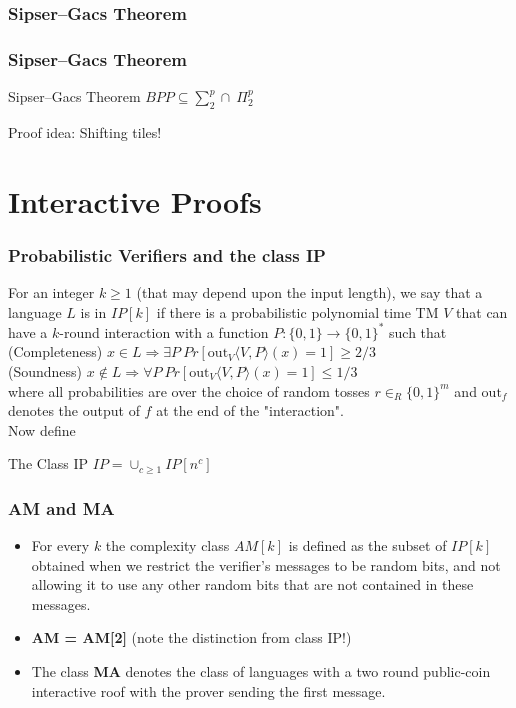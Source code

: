\documentclass{beamer}
\begin{document}
\subsubsection{Sipser--Gacs Theorem}

\begin{frame}
\frametitle{Sipser--Gacs Theorem}
\begin{block}{Sipser--Gacs Theorem}
$BPP \subseteq \sum_2^p \cap\ \Pi_2^p$
\end{block}

Proof idea: Shifting tiles!

\end{frame}

\section{Interactive Proofs}

\begin{frame}
\frametitle{Probabilistic Verifiers and the class IP}

For an integer $k \geq 1$ (that may depend upon the input length), we say that a language $L$ is in $IP[k]$ if there is a probabilistic polynomial time TM $V$ that can have a $k$-round interaction with a function $P:\{0,1\} \to \{0,1\}^*$ such that\\

(Completeness) $x \in L \Rightarrow \exists P\ Pr[\textrm{out}_V \langle V, P \rangle (x) = 1] \geq 2/3$\\
(Soundness) $x \notin L \Rightarrow \forall P\ Pr[\textrm{out}_V \langle V, P \rangle (x) = 1] \leq 1/3$\\

where all probabilities are over the choice of random tosses $r \in_R \{0,1\}^m$ and $\textrm{out}_f$ denotes the output of $f$ at the end of the "interaction".\\

Now define

\begin{block}{The Class IP}
$IP = \cup_{c \geq 1} IP[n^c]$
\end{block}

\end{frame}

\begin{frame}
\frametitle{AM and MA}

\begin{itemize}
\item For every $k$ the complexity class $AM[k]$ is defined as the subset of $IP[k]$ obtained when we restrict the verifier's messages to be random bits, and not allowing it to use any other random bits that are not contained in these messages.
\item \textbf{AM = AM[2]} (note the distinction from class IP!)
\item The class \textbf{MA} denotes the class of languages with a two round public-coin interactive roof with the prover sending the first message. 
\end{itemize}




\end{frame}
\end{document}
